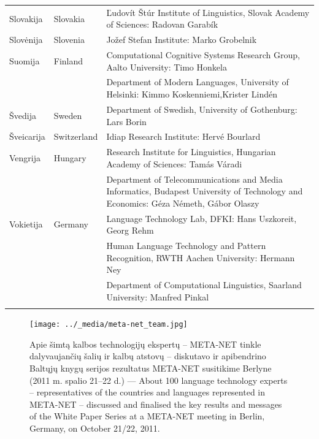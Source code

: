 \begin{longtable}{llp{113mm}}
  Slovakija & \textcolor{grey1}{Slovakia} &  Ľudovít Štúr Institute of Linguistics, Slovak Academy of Sciences: Radovan Garabík \\ \addlinespace
   
  Slovėnija & \textcolor{grey1}{Slovenia} & Jožef Stefan Institute: Marko Grobelnik \\ \addlinespace
   
 Suomija & \textcolor{grey1}{Finland} & Computational Cognitive Systems Research Group, Aalto University: Timo Honkela\\ \addlinespace
  & & Department of Modern Languages, University of Helsinki: Kimmo Koskenniemi,\newline Krister Lindén \\ \addlinespace
  
  Švedija & \textcolor{grey1}{Sweden} & Department of Swedish, University of Gothenburg: Lars Borin \\ \addlinespace
   
  Šveicarija & \textcolor{grey1}{Switzerland} & Idiap Research Institute: Hervé Bourlard \\ \addlinespace 
   
  Vengrija & \textcolor{grey1}{Hungary} & Research Institute for Linguistics, Hungarian Academy of Sciences: Tamás Váradi\\  \addlinespace
  & & Department of Telecommunications and Media Informatics, Budapest University of Technology and Economics: Géza Németh, Gábor Olaszy\\ \addlinespace
  
  Vokietija & \textcolor{grey1}{Germany} & Language Technology Lab, DFKI: Hans Uszkoreit, Georg Rehm\\ \addlinespace
  & & Human Language Technology and Pattern Recognition, RWTH Aachen University: Hermann Ney \\ \addlinespace
  & & Department of Computational Linguistics, Saarland University: Manfred Pinkal\\ \addlinespace
\end{longtable}
\normalsize

\renewcommand*{\figureformat}{}
\renewcommand*{\captionformat}{}

\begin{figure}[htbp]
  \center
  \texttt{[image: ../\_media/meta-net\_team.jpg]}
  \caption{Apie šimtą kalbos technologijų ekspertų -- META-NET tinkle dalyvaujančių šalių ir kalbų atstovų -- diskutavo ir apibendrino Baltųjų knygų serijos rezultatus META-NET susitikime Berlyne (2011 m. spalio 21–22 d.) --- \textcolor{grey1}{About 100 language technology experts -- representatives of the countries and languages represented in META-NET -- discussed and finalised the key results and messages of the White Paper Series at a META-NET meeting in Berlin, Germany, on October 21/22, 2011.}}
  \medskip
\end{figure}

